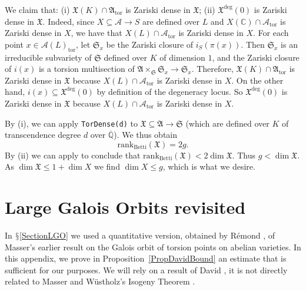 \documentclass[12pt,oneside]{amsart}
\numberwithin{maincounter}{section}
\numberwithin{equation}{section}
\def\CC{\mathbb{C}}
\def\QQ{\mathbb{Q}}
\newcommand{\cal}{\mathcal}
\newcommand{\cA}{\cal{A}}
\newcommand{\IC}{{\CC}}
\newcommand{\IQbar}{{\overline{\QQ}}}
\newcommand{\tor}[1]{{#1}_{\mathrm{tor}}}
\begin{document}
We claim that: (i) $\mathfrak{X}(K) \cap \mathfrak{A}_{\mathrm{tor}}$ is Zariski dense in $\mathfrak{X}$; (ii) $\mathfrak{X}^{\mathrm{deg}}(0)$ is Zariski dense in $\mathfrak{X}$. 
 Indeed, since $X\subseteq \cA \rightarrow S$ are defined over $L$ and $X(\IC) \cap \cA_{\mathrm{tor}}$ is Zariski dense in $X$, we have that $X(L) \cap \cA_{\mathrm{tor}}$ is Zariski dense in $X$. For each point $x \in \tor{\cA(L)}$, let $\mathfrak{S}_x$ be the Zariski closure of $i_S(\pi(x))$. Then $\mathfrak{S}_x$ is an irreducible subvariety of $\mathfrak{S}$ defined over $K$ of dimension $1$, and the Zariski closure of $i(x)$ is a torsion multisection of $\mathfrak{A}\times_{\mathfrak{S}} \mathfrak{S}_x \rightarrow \mathfrak{S}_x$. 
Therefore, $\mathfrak{X}(K) \cap \mathfrak{A}_{\mathrm{tor}}$ is Zariski dense in $\mathfrak{X}$ because $X(L) \cap \cA_{\mathrm{tor}}$ is Zariski dense in $X$. On the other hand, $i(x) \subseteq \mathfrak{X}^{\mathrm{deg}}(0)$ by definition of the degeneracy locus. So $\mathfrak{X}^{\mathrm{deg}}(0)$ is Zariski dense in $\mathfrak{X}$ because $X(L)\cap \cA_{\mathrm{tor}}$ is Zariski dense in $X$.


By (i), we can apply {\tt TorDense(d)} to $\mathfrak{X} \subseteq \mathfrak{A} \rightarrow \mathfrak{S}$ (which are defined over $K$ of transcendence degree $d$ over $\IQbar$). We thus obtain
\[
\mathrm{rank}_{\mathrm{Betti}}(\mathfrak{X}) = 2g.
\]
By (ii) we can apply 
\cite[Theorem~4.3.1]{GaoHDR} to conclude that
$\mathrm{rank}_{\mathrm{Betti}}(\mathfrak{X}) < 2\dim \mathfrak{X}$.
Thus $g<\dim\mathfrak X$. As $\dim\mathfrak X \le 1+\dim X$ we find
$\dim X\le g$, which is what we desire.
\fi





\appendix
\renewcommand{\thesection}{\Alph{section}}
\setcounter{section}{0}

\section{Large Galois Orbits revisited}
\label{Appendix}
In $\mathsection$\ref{SectionLGO} we used a quantitative version,
obtained by R\'{e}mond \cite[Proposition~2.9]{RemondGaloisBound}, of
Masser's earlier result on the Galois orbit of torsion points on
abelian varieties. In this appendix, we prove in
Proposition~\ref{PropDavidBound} an estimate that is sufficient for
our purposes. We will rely on a result of David
\cite[Th\'eor\`eme~1.4]{DavidMinHaut}, it is not directly related to
Masser and W\"{u}stholz's Isogeny Theorem \cite{MW:abelianisog}.
\end{document}
